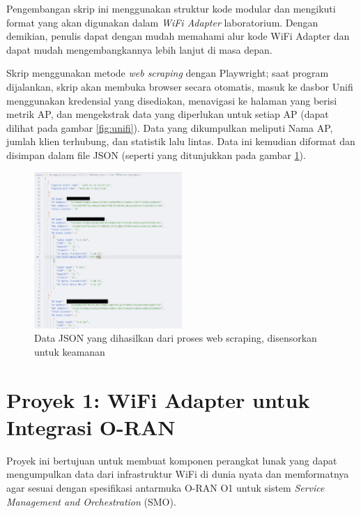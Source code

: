 Pengembangan skrip ini menggunakan struktur kode modular dan mengikuti format yang akan digunakan dalam \textit{WiFi Adapter} laboratorium. Dengan demikian, penulis dapat dengan mudah memahami alur kode WiFi Adapter dan dapat mudah mengembangkannya lebih lanjut di masa depan.

Skrip menggunakan metode \textit{web scraping} dengan Playwright; saat program dijalankan, skrip akan membuka browser secara otomatis, masuk ke dasbor Unifi menggunakan kredensial yang disediakan, menavigasi ke halaman yang berisi metrik AP, dan mengekstrak data yang diperlukan untuk setiap AP (dapat dilihat pada gambar \ref{fig:unifi}). Data yang dikumpulkan meliputi Nama AP, jumlah klien terhubung, dan statistik lalu lintas. Data ini kemudian diformat dan disimpan dalam file JSON (seperti yang ditunjukkan pada gambar \ref{fig:unifijson}).

\begin{figure}[htbp]
    \centering
    \includegraphics[width=0.5\textwidth]{assets/pics/unifijson.png}
    \caption{Data JSON yang dihasilkan dari proses web scraping, disensorkan untuk keamanan}
    \label{fig:unifijson}
\end{figure}



\section{Proyek 1: WiFi Adapter untuk Integrasi O-RAN}
Proyek ini bertujuan untuk membuat komponen perangkat lunak yang dapat mengumpulkan data dari infrastruktur WiFi di dunia nyata dan memformatnya agar sesuai dengan spesifikasi antarmuka O-RAN O1 untuk sistem \textit{Service Management and Orchestration} (SMO).


